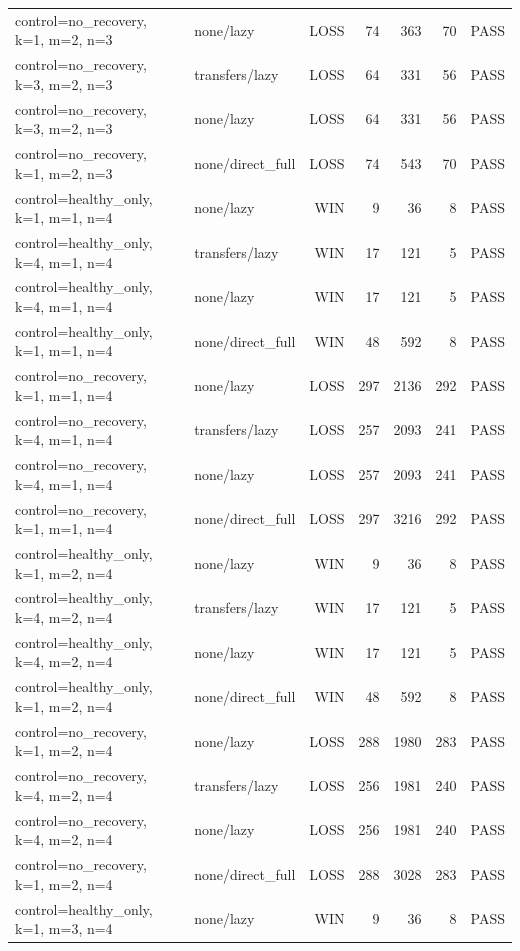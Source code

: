 \begin{longtable}{llrrrrl}
control=no\_recovery, k=1, m=2, n=3 & none/lazy & LOSS & 74 & 363 & 70 & PASS \\
control=no\_recovery, k=3, m=2, n=3 & transfers/lazy & LOSS & 64 & 331 & 56 & PASS \\
control=no\_recovery, k=3, m=2, n=3 & none/lazy & LOSS & 64 & 331 & 56 & PASS \\
control=no\_recovery, k=1, m=2, n=3 & none/direct\_full & LOSS & 74 & 543 & 70 & PASS \\
control=healthy\_only, k=1, m=1, n=4 & none/lazy & WIN & 9 & 36 & 8 & PASS \\
control=healthy\_only, k=4, m=1, n=4 & transfers/lazy & WIN & 17 & 121 & 5 & PASS \\
control=healthy\_only, k=4, m=1, n=4 & none/lazy & WIN & 17 & 121 & 5 & PASS \\
control=healthy\_only, k=1, m=1, n=4 & none/direct\_full & WIN & 48 & 592 & 8 & PASS \\
control=no\_recovery, k=1, m=1, n=4 & none/lazy & LOSS & 297 & 2136 & 292 & PASS \\
control=no\_recovery, k=4, m=1, n=4 & transfers/lazy & LOSS & 257 & 2093 & 241 & PASS \\
control=no\_recovery, k=4, m=1, n=4 & none/lazy & LOSS & 257 & 2093 & 241 & PASS \\
control=no\_recovery, k=1, m=1, n=4 & none/direct\_full & LOSS & 297 & 3216 & 292 & PASS \\
control=healthy\_only, k=1, m=2, n=4 & none/lazy & WIN & 9 & 36 & 8 & PASS \\
control=healthy\_only, k=4, m=2, n=4 & transfers/lazy & WIN & 17 & 121 & 5 & PASS \\
control=healthy\_only, k=4, m=2, n=4 & none/lazy & WIN & 17 & 121 & 5 & PASS \\
control=healthy\_only, k=1, m=2, n=4 & none/direct\_full & WIN & 48 & 592 & 8 & PASS \\
control=no\_recovery, k=1, m=2, n=4 & none/lazy & LOSS & 288 & 1980 & 283 & PASS \\
control=no\_recovery, k=4, m=2, n=4 & transfers/lazy & LOSS & 256 & 1981 & 240 & PASS \\
control=no\_recovery, k=4, m=2, n=4 & none/lazy & LOSS & 256 & 1981 & 240 & PASS \\
control=no\_recovery, k=1, m=2, n=4 & none/direct\_full & LOSS & 288 & 3028 & 283 & PASS \\
control=healthy\_only, k=1, m=3, n=4 & none/lazy & WIN & 9 & 36 & 8 & PASS \\

\end{longtable}
